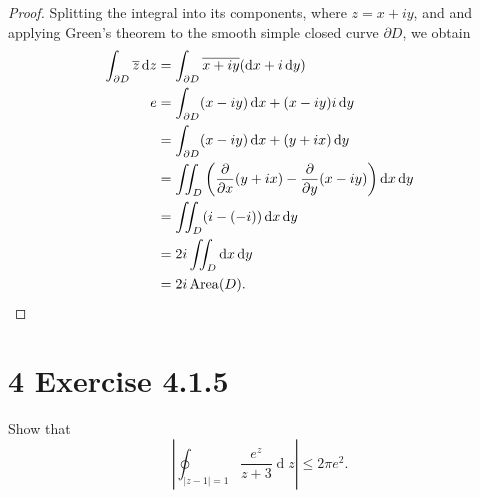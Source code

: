 \documentclass[12pt]{article}
\newenvironment{problem}
    {\begin{lrbox}{\mybox}\begin{minipage}{0.98\textwidth}}
    {\end{minipage}\end{lrbox}\framebox[\textwidth]{\usebox{\mybox}}}
\newcommand{\<}{\left\langle} %
\renewcommand{\>}{\right\rangle} %
\renewcommand{\d}[1]{\operatorname{d}\!#1} %
\newcommand{\pd}[3][1]{\ifnum#1=1{\frac{\partial #2}{\partial#3}}\else{\frac{\partial^{#1}#2}{\partial#3^{#1}}}\fi} %
\let\conj\overline %
\begin{document}
\begin{proof}
    Splitting the integral into its components, where $z=x+iy$, and and applying Green's theorem to the smooth simple closed curve $\partial D$, we obtain
    \begin{align*}
        \int_{\partial D} \conj{z}\d{z}
            &= \int_{\partial D} \conj{x + iy}(\d{x} + i \d{y}) \\e
            &= \int_{\partial D} (x - iy)\d{x} + (x - iy)i\d{y} \\
            &= \int_{\partial D} (x - iy)\d{x} + (y + ix)\d{y} \\
            &= \iint_D \left(\pd{}{x}(y + ix) - \pd{}{y}(x - iy)\right)\d{x}\d{y} \\
            &= \iint_D (i - (-i))\d{x}\d{y} \\
            &= 2i\iint_D \d{x}\d{y} \\
            &= 2i\operatorname{Area}(D).
    \end{align*}
    
\end{proof}

\newpage
\section*{4 Exercise 4.1.5}
\begin{problem}
    Show that
    \[\left|\oint_{|z-1|=1} \frac{e^z}{z+3}\d{z}\right| \leq 2\pi e^2.\]
\end{problem}
\end{document}
